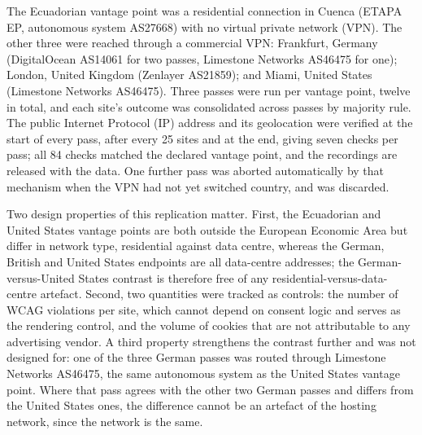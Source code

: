 \documentclass[]{interact}
\begin{document}
The Ecuadorian vantage point was a residential connection in Cuenca (ETAPA EP, autonomous system AS27668) with no virtual private network (VPN). The other three were reached through a commercial VPN: Frankfurt, Germany (DigitalOcean AS14061 for two passes, Limestone Networks AS46475 for one); London, United Kingdom (Zenlayer AS21859); and Miami, United States (Limestone Networks AS46475). Three passes were run per vantage point, twelve in total, and each site's outcome was consolidated across passes by majority rule. The public Internet Protocol (IP) address and its geolocation were verified at the start of every pass, after every 25 sites and at the end, giving seven checks per pass; all 84 checks matched the declared vantage point, and the recordings are released with the data. One further pass was aborted automatically by that mechanism when the VPN had not yet switched country, and was discarded.

Two design properties of this replication matter. First, the Ecuadorian and United States vantage points are both outside the European Economic Area but differ in network type, residential against data centre, whereas the German, British and United States endpoints are all data-centre addresses; the German-versus-United States contrast is therefore free of any residential-versus-data-centre artefact. Second, two quantities were tracked as controls: the number of WCAG violations per site, which cannot depend on consent logic and serves as the rendering control, and the volume of cookies that are not attributable to any advertising vendor. A third property strengthens the contrast further and was not designed for: one of the three German passes was routed through Limestone Networks AS46475, the same autonomous system as the United States vantage point. Where that pass agrees with the other two German passes and differs from the United States ones, the difference cannot be an artefact of the hosting network, since the network is the same.
\end{document}
